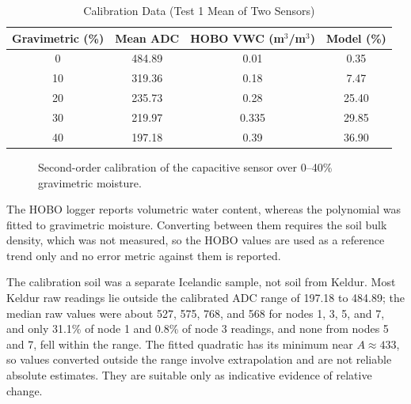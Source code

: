 \documentclass[conference]{IEEEtran}
\begin{document}
\begin{table}[t]
\caption{Calibration Data (Test 1 Mean of Two Sensors)}
\label{tab:cal}
\centering
\small
\begin{tabular}{@{}cccc@{}}
\toprule
Gravimetric (\%) & Mean ADC & HOBO VWC (m$^3$/m$^3$) & Model (\%) \\
\midrule
0 & 484.89 & 0.01 & 0.35 \\
10 & 319.36 & 0.18 & 7.47 \\
20 & 235.73 & 0.28 & 25.40 \\
30 & 219.97 & 0.335 & 29.85 \\
40 & 197.18 & 0.39 & 36.90 \\
\bottomrule
\end{tabular}
\end{table}

\begin{figure}[t]
\centering
{}
\caption{Second-order calibration of the capacitive sensor over 0--40\% gravimetric moisture.}
\label{fig:cal}
\end{figure}

The HOBO logger reports volumetric water content, whereas the polynomial was fitted to gravimetric moisture. Converting between them requires the soil bulk density, which was not measured, so the HOBO values are used as a reference trend only and no error metric against them is reported.

The calibration soil was a separate Icelandic sample, not soil from Keldur. Most Keldur raw readings lie outside the calibrated ADC range of 197.18 to 484.89; the median raw values were about 527, 575, 768, and 568 for nodes 1, 3, 5, and 7, and only 31.1\% of node 1 and 0.8\% of node 3 readings, and none from nodes 5 and 7, fell within the range. The fitted quadratic has its minimum near $A\approx433$, so values converted outside the range involve extrapolation and are not reliable absolute estimates. They are suitable only as indicative evidence of relative change.
\end{document}
